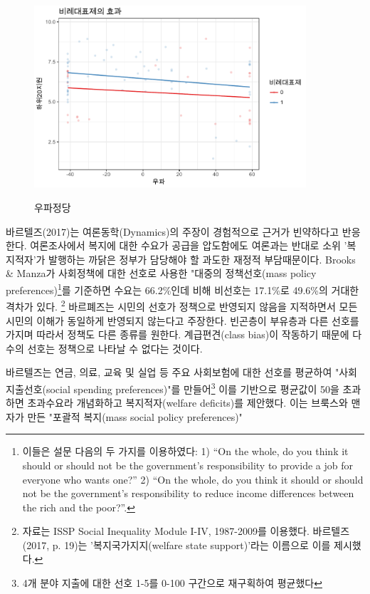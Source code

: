 \documentclass[12pt,a4paper]{book}
\begin{document}
\begin{figure}
\centering
        \includegraphics[width=0.9\textwidth]{pr_right.pdf}\\
        \caption{우파정당}
\end{figure}

바르텔즈(2017)는 여론동학(Dynamics)의 주장이 경험적으로 근거가 빈약하다고 반응한다. 여론조사에서 복지에 대한 수요가 공급을 압도함에도 여론과는 반대로 소위 '복지적자'가 발행하는 까닭은 정부가 담당해야 할 과도한 재정적 부담때문이다. Brooks \& Manza가 사회정책에 대한 선호로 사용한 "대중의 정책선호(mass policy preferences)\footnote{이들은 설문 다음의 두 가지를 이용하였다: 1) “On the whole, do you think it should or should not be the government’s responsibility to provide a job for everyone who wants one?” 2) “On the whole, do you think it should or should not be the government’s responsibility to reduce income differences between the rich and the poor?”.}를 기준하면 수요는 66.2\%인데 비해 비선호는 17.1\%로 49.6\%의 거대한 격차가 있다. \footnote{자료는 ISSP Social Inequality Module I-IV, 1987-2009를 이용했다. 바르텔즈(2017, p. 19)는 '복지국가지지(welfare state support)'라는 이름으로 이를  제시했다.}  바르폐즈는 시민의 선호가 정책으로 반영되지 않음을 지적하면서 모든 시민의 이해가 동일하게 반영되지 않는다고 주장한다. 빈곤층이 부유층과 다른 선호를 가지며 따라서 정책도 다른 종류를 원한다. 계급편견(class bias)이 작동하기 때문에 다수의 선호는 정책으로 나타날 수 없다는 것이다. 

바르텔즈는 연금, 의료, 교육 및 실업 등 주요 사회보험에 대한 선호를 평균하여 "사회지출선호(social spending preferences)"를 만들어\footnote{4개 분야 지출에 대한 선호 1-5를 0-100 구간으로 재구획하여 평균했다} 이를 기반으로 평균값이 50을 초과하면 초과수요라 개념화하고 복지적자(welfare deficits)를 제안했다.  이는 브룩스와 맨자가 만든 "포괄적 복지(mass social policy preferences)"
\end{document}
